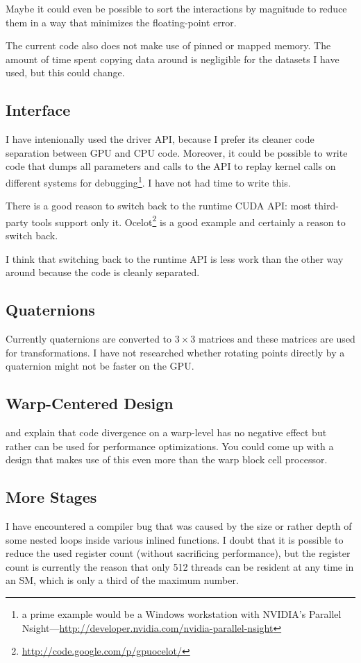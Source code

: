 Maybe it could even be possible to sort the interactions by magnitude to reduce them in a way that minimizes the floating-point error.

The current code also does not make use of pinned or mapped memory. The amount of time spent copying data around is negligible for the datasets I have used, but this could change.

\subsection{\cuda{} Interface}
I have intenionally used the driver API, because I prefer its cleaner code separation between GPU and CPU code. Moreover, it could be possible to write code that dumps all parameters and calls to the API to replay kernel calls on different systems for debugging\footnote{a prime example would be a Windows workstation with NVIDIA's Parallel Nsight---\url{http://developer.nvidia.com/nvidia-parallel-nsight}}. I have not had time to write this.

There is a good reason to switch back to the runtime CUDA API: most third-party tools support only it. Ocelot\footnote{\url{http://code.google.com/p/gpuocelot/}} is a good example and certainly a reason to switch back.

I think that switching back to the runtime API is less work than the other way around because the code is cleanly separated.

\subsection{Quaternions}
Currently quaternions are converted to $3 \times 3$ matrices and these matrices are used for transformations. I have not researched whether rotating points directly by a quaternion might not be faster on the GPU.

\subsection{Warp-Centered Design}
\cite{cudaDMA} and \cite{DBLP:conf/ispass/WongPSM10} explain that code divergence on a warp-level has no negative effect but rather can be used for performance optimizations.
You could come up with a design that makes use of this even more than the warp block cell processor.

\subsection{More Stages}
I have encountered a compiler bug that was caused by the size or rather depth of some nested loops inside various inlined functions. I doubt that it is possible to reduce the used register count (without sacrificing performance), but the register count is currently the reason that only 512 threads can be resident at any time in an SM, which is only a third of the maximum number.

